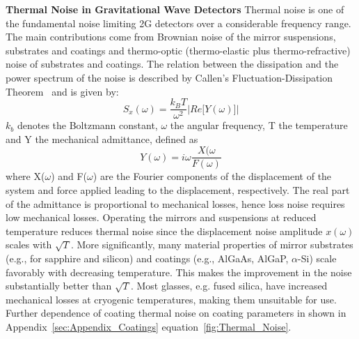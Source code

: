 \begin{Infobox}{\bf Thermal Noise in Gravitational Wave Detectors}
\label{Box:Thermal}
Thermal noise is one of the fundamental noise limiting 2G detectors over a considerable frequency range. The main contributions come from Brownian noise of the mirror suspensions, substrates and coatings and thermo-optic (thermo-elastic plus thermo-refractive) noise of substrates and coatings. The relation between the dissipation and the power spectrum of the noise is described by Callen's Fluctuation-Dissipation Theorem~\cite{CaWe1951, Kubo:FDT, Callen:1959} and is given by:
\begin{equation}
S_x(\omega) = \frac{k_B T}{\omega^2} \left| Re \big[ Y(\omega) \big]\right| 
\end{equation}
\label{eq:FDT}
$k_b$ denotes the Boltzmann constant, $\omega$ the angular frequency, T the temperature and Y the mechanical admittance, defined as
\begin{equation}
Y(\omega) = i \omega\frac{X(\omega}{F(\omega)}
\end{equation}
where X($\omega$) and F($\omega$) are the Fourier components of the displacement of the system and force applied leading to the displacement, respectively. The real part of the admittance is proportional to mechanical losses, hence loss noise requires low mechanical losses.
Operating the mirrors and suspensions at reduced temperature reduces thermal noise since the displacement noise amplitude $x(\omega)$ scales with $\sqrt{T}$. More significantly, many material properties of mirror substrates (e.g., for sapphire and silicon) and coatings (e.g., AlGaAs, AlGaP, $\alpha$-Si) scale favorably with decreasing temperature. This makes the improvement in the noise substantially better than $\sqrt{T}$. Most glasses, e.g. fused silica, have increased mechanical losses at cryogenic temperatures, making them unsuitable for use. Further dependence of coating thermal noise on coating parameters in shown in Appendix~\ref{sec:Appendix_Coatings} equation~\ref{fig:Thermal_Noise}.
\end{Infobox}

